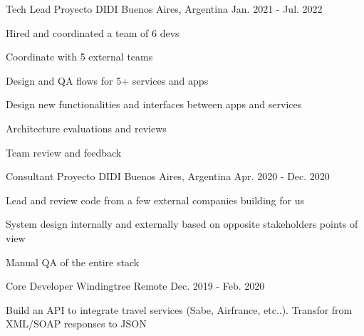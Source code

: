 \begin{cventries}
{\begin{cvitems}
\end{cvitems}
}
\cventry
{Tech Lead} %
{Proyecto DIDI} %
{Buenos Aires, Argentina} %
{Jan. 2021 - Jul. 2022} %
{ %
\begin{cvitems}
\item {Hired and coordinated a team of 6 devs}
\item {Coordinate with 5 external teams}
\item {Design and QA flows for 5+ services and apps}
\item {Design new functionalities and interfaces between apps and services}
\item {Architecture evaluations and reviews}
\item {Team review and feedback}
\end{cvitems}
}
\cventry
{Consultant} %
{Proyecto DIDI} %
{Buenos Aires, Argentina} %
{Apr. 2020 - Dec. 2020} %
{ %
\begin{cvitems}
\item {Lead and review code from a few external companies building for us}
\item {System design internally and externally based on opposite stakeholders points of view}
\item {Manual QA of the entire stack}
\end{cvitems}
}
\cventry
{Core Developer} %
{Windingtree} %
{Remote} %
{Dec. 2019 - Feb. 2020} %
{ %
\begin{cvitems}
\item {Build an API to integrate travel services (Sabe, Airfrance, etc..). Transfor from XML/SOAP responses to JSON}

\end{cvitems}}
\end{cventries}

